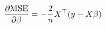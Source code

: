 \documentclass[preview]{standalone}
\begin{document}
\begin{align*}
\special{dvisvgm:raw <g id='unique000'>}\frac{\partial \text{MSE}}{\partial \beta} = -\frac{2}{n}X^\top(y - X\beta)\special{dvisvgm:raw </g>}
\end{align*}
\end{document}
